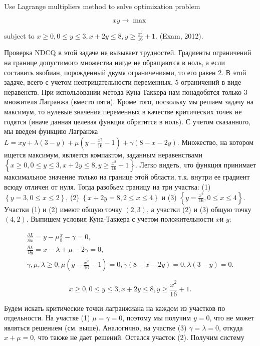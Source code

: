\begin{problem}
Use Lagrange multipliers method to solve optimization problem

\[xy\to \max \] 

subject to $x\ge 0,  0\le y\le 3,  x+2y\le 8,  y\ge \frac{x^{2} }{16} +1$. (Exam, 2012).
\end{problem}

\begin{solution}
Проверка NDCQ в этой задаче не вызывает трудностей. Градиенты ограничений на границе допустимого множества нигде не обращаются в ноль, а если составить якобиан, порожденный двумя ограничениями, то его равен 2. В этой задаче, всего с учетом неотрицательности переменных, 5 ограничений в виде неравенств. При использовании метода Куна-Таккера нам понадобятся только 3 множителя Лагранжа (вместо пяти). Кроме того, поскольку мы решаем задачу на максимум, то нулевые значения переменных в качестве критических точек не годятся (иначе данная целевая функция обратится в ноль). С учетом сказанного, мы введем функцию Лагранжа $L=xy+\lambda (3-y)+\mu (y-\frac{x^{2} }{16} -1)+\gamma (8-x-2y)$. Множество, на котором ищется максимум, является компактом, заданным неравенствами $\left\{\right. x\ge 0,  0\le y\le 3,  x+2y\le 8,  y\ge \frac{x^{2} }{16} +1\left. \right\}$. Легко видеть, что функция принимает максимальное значение только на границе этой области, т.к. внутри ее градиент всюду отличен от нуля. Тогда разобьем границу на три участка: (1) $\left\{y=3,  0\le x\le 2\right\}$, (2) $\left\{x+2y=8,  2\le x\le 4\right\}$ и (3) $\left\{y=\frac{x^{2} }{16} ,  0\le x\le 4\right\}$. Участки (1) и (2) имеют общую точку $(2,3)$, а участки (2) и (3) общую точку $(4,2)$. Выпишем условия Куна-Таккера с учетом положительности $x$и $y$:

\[\begin{array}{l} {\frac{\partial L}{\partial x} =y-\mu \frac{x}{8} -\gamma =0,} \\ {\frac{\partial L}{\partial y} =x-\lambda +\mu -2\gamma =0,} \\ {\gamma ,\mu ,\lambda \ge 0,  \mu (y-\frac{x^{2} }{16} -1)=0,  \gamma (8-x-2y)=0,  \lambda (3-y)=0.} \end{array}\] 

\[x\ge 0,  0\le y\le 3,  x+2y\le 8,  y\ge \frac{x^{2} }{16} +1.\] 

Будем искать критические точки лагранжиана на каждом из участков по отдельности. На участке (1) $\mu =\gamma =0$, поэтому мы получим $y=0$, что не может являться решением (см. выше). Аналогично, на участке (3)  $\gamma =\lambda =0$, откуда $x+\mu =0$, что также не дает решений. Остался участок (2).  Получим систему


\end{solution}
